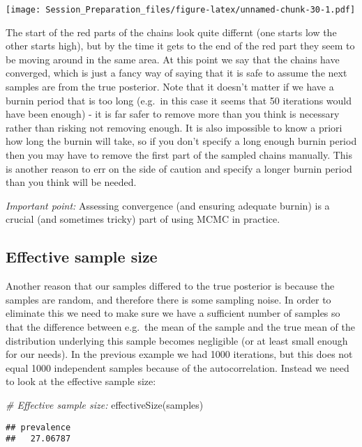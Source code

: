 \documentclass[
  12pt,
]{article}
\newenvironment{Shaded}{\begin{snugshade}}{\end{snugshade}}
\newcommand{\CommentTok}[1]{\textcolor[rgb]{0.56,0.35,0.01}{\textit{#1}}}
\newcommand{\FunctionTok}[1]{\textcolor[rgb]{0.00,0.00,0.00}{#1}}
\newcommand{\NormalTok}[1]{#1}
\begin{document}
\texttt{[image: Session\_Preparation\_files/figure-latex/unnamed-chunk-30-1.pdf]}

The start of the red parts of the chains look quite differnt (one starts
low the other starts high), but by the time it gets to the end of the
red part they seem to be moving around in the same area. At this point
we say that the chains have converged, which is just a fancy way of
saying that it is safe to assume the next samples are from the true
posterior. Note that it doesn't matter if we have a burnin period that
is too long (e.g.~in this case it seems that 50 iterations would have
been enough) - it is far safer to remove more than you think is
necessary rather than risking not removing enough. It is also impossible
to know a priori how long the burnin will take, so if you don't specify
a long enough burnin period then you may have to remove the first part
of the sampled chains manually. This is another reason to err on the
side of caution and specify a longer burnin period than you think will
be needed.

\emph{Important point:} Assessing convergence (and ensuring adequate
burnin) is a crucial (and sometimes tricky) part of using MCMC in
practice.

\hypertarget{effective-sample-size}{%
\subsection{Effective sample size}\label{effective-sample-size}}

Another reason that our samples differed to the true posterior is
because the samples are random, and therefore there is some sampling
noise. In order to eliminate this we need to make sure we have a
sufficient number of samples so that the difference between e.g.~the
mean of the sample and the true mean of the distribution underlying this
sample becomes negligible (or at least small enough for our needs). In
the previous example we had 1000 iterations, but this does not equal
1000 independent samples because of the autocorrelation. Instead we need
to look at the effective sample size:

\begin{Shaded}
\begin{Highlighting}[]
\CommentTok{\# Effective sample size:}
\FunctionTok{effectiveSize}\NormalTok{(samples)}
\end{Highlighting}
\end{Shaded}

\begin{verbatim}
## prevalence 
##   27.06787
\end{verbatim}
\end{document}
